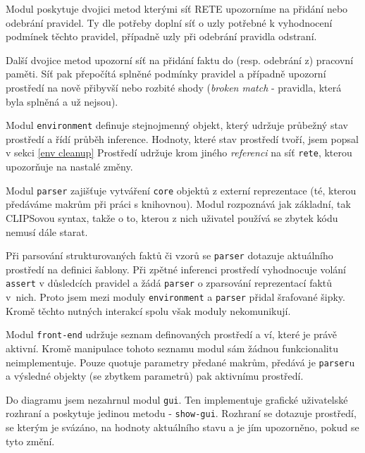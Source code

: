Modul poskytuje dvojici metod kterými síť RETE upozorníme na přidání nebo
odebrání pravidel. Ty dle potřeby doplní síť o uzly potřebné k vyhodnocení
podmínek těchto pravidel, případně uzly při odebrání pravidla odstraní.

Další dvojice metod upozorní síť na přidání faktu do (resp. odebrání z) pracovní
paměti. Síť pak přepočítá splněné podmínky pravidel a případně upozorní
prostředí na nově přibyvší nebo rozbité shody (\emph{broken match} - pravidla,
která byla splněná a už nejsou).

Modul \verb|environment| definuje stejnojmenný objekt, který udržuje průbežný
stav prostředí a řídí průběh inference. Hodnoty, které stav prostředí tvoří,
jsem popsal v sekci \ref{env cleanup} Prostředí udržuje krom jiného
\emph{referenci} na síť \verb|rete|, kterou upozorňuje na nastalé změny.

Modul \verb|parser| zajišťuje vytváření \verb|core| objektů z externí
reprezentace (té, kterou předáváme makrům při práci s knihovnou). Modul
rozpoznává jak základní, tak CLIPSovou syntax, takže o to, kterou z nich
uživatel používá se zbytek kódu nemusí dále starat.

Při parsování strukturovaných faktů či vzorů se \verb|parser| dotazuje
aktuálního prostředí na definici šablony. Při zpětné inferenci prostředí
vyhodnocuje volání \verb|assert| v důsledcích pravidel a žádá \verb|parser| o
zparsování reprezentací faktů v~nich. Proto jsem mezi moduly \verb|environment|
a \verb|parser| přidal šrafované šipky. Kromě těchto nutných interakcí spolu
však moduly nekomunikují.

Modul \verb|front-end| udržuje seznam definovaných prostředí a ví, které je
právě aktivní. Kromě manipulace tohoto seznamu modul sám žádnou funkcionalitu
neimplementuje. Pouze quotuje parametry předané makrům, předává je
\verb|parser|u a výsledné objekty (se zbytkem parametrů) pak aktivnímu prostředí.

Do diagramu jsem nezahrnul modul \verb|gui|. Ten implementuje grafické
uživatelské rozhraní a poskytuje jedinou metodu - \verb|show-gui|. Rozhraní se
dotazuje prostředí, se kterým je svázáno, na hodnoty aktuálního stavu a je jím
upozorněno, pokud se tyto změní.

